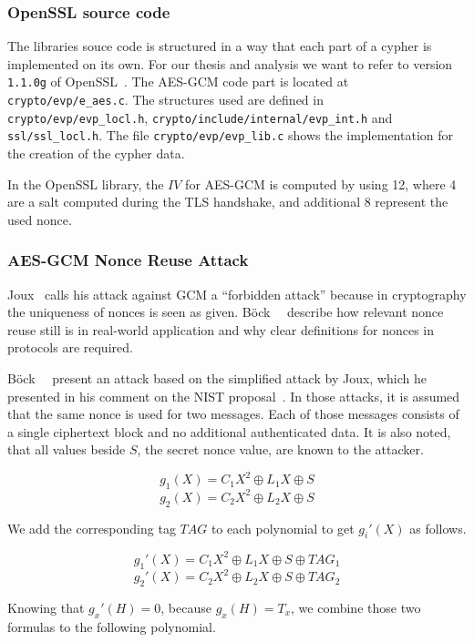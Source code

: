 \subsubsection{OpenSSL source code}

The libraries souce code is structured in a way that each part of a
cypher is implemented on its own. For our thesis and analysis we want to
refer to version \texttt{1.1.0g} of OpenSSL~\cite{opensslsource}. The AES-GCM
code part is located at \texttt{crypto/evp/e\_aes.c}. The structures used are
defined in \texttt{crypto/evp/evp\_locl.h},
\texttt{crypto/include/internal/evp\_int.h} and \texttt{ssl/ssl\_locl.h}. The
file \texttt{crypto/evp/evp\_lib.c} shows the implementation for the creation of
the cypher data.

In the OpenSSL library, the $IV$ for AES-GCM is computed by using
\SI{12}{\byte}, where \SI{4}{\byte} are a salt computed during the TLS
handshake, and additional \SI{8}{\byte} represent the used nonce.

\subsubsection{AES-GCM Nonce Reuse Attack}

Joux~\cite{NISTGCMcomment} calls his attack against GCM a ``forbidden attack''
because in cryptography the uniqueness of nonces is seen as given.
Böck~\etal~\cite{gcmnonceattack} describe how relevant nonce reuse still is in
real-world application and why clear definitions for nonces in protocols are
required.

Böck~\etal~\cite{gcmnonceattack} present an attack based on the simplified
attack by Joux, which he presented in his comment on the NIST
proposal~\cite{NISTGCMcomment}.  In those attacks, it is assumed that the same
nonce is used for two messages. Each of those messages consists of a single
ciphertext block and no additional authenticated data. It is also noted, that
all values beside $S$, the secret nonce value, are known to the attacker.

\[g_1(X) = C{_{1}X^2 \oplus L_1X \oplus S}\]
\[g_2(X) = C{_{2}X^2 \oplus L_2X \oplus S}\]

We add the corresponding tag $TAG$ to each polynomial to get $g_i'(X)$ as
follows.

\[g_1'(X) = C{_{1}X^2 \oplus L_1X \oplus S \oplus TAG_1}\]
\[g_2'(X) = C{_{2}X^2 \oplus L_2X \oplus S \oplus TAG_2}\]

Knowing that $g_x'(H) = 0$, because $g_x(H) = T_x$, we combine those two
formulas to the following polynomial.

